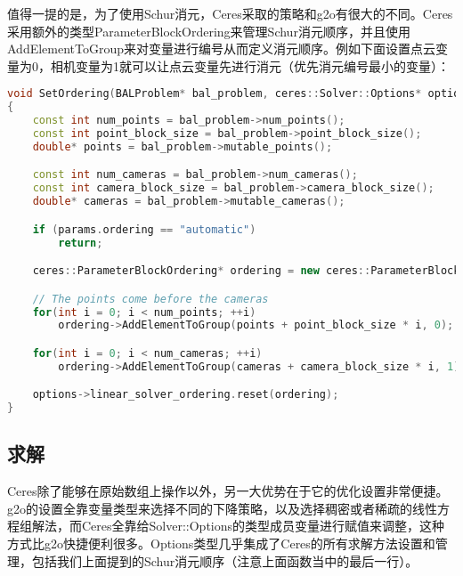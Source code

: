 值得一提的是，为了使用Schur消元，Ceres采取的策略和g2o有很大的不同。Ceres采用额外的类型ParameterBlockOrdering来管理Schur消元顺序，并且使用AddElementToGroup来对变量进行编号从而定义消元顺序。例如下面设置点云变量为0，相机变量为1就可以让点云变量先进行消元（优先消元编号最小的变量）：

\begin{lstlisting}[language=c++,caption=slambook/ch10/ceres_custombundle/ceresBundle.cpp]
void SetOrdering(BALProblem* bal_problem, ceres::Solver::Options* options, const BundleParams& params)
{
	const int num_points = bal_problem->num_points();
	const int point_block_size = bal_problem->point_block_size();
	double* points = bal_problem->mutable_points();

	const int num_cameras = bal_problem->num_cameras();
	const int camera_block_size = bal_problem->camera_block_size();
	double* cameras = bal_problem->mutable_cameras();

	if (params.ordering == "automatic")
		return;

	ceres::ParameterBlockOrdering* ordering = new ceres::ParameterBlockOrdering;

	// The points come before the cameras
	for(int i = 0; i < num_points; ++i)
		ordering->AddElementToGroup(points + point_block_size * i, 0);

	for(int i = 0; i < num_cameras; ++i)
		ordering->AddElementToGroup(cameras + camera_block_size * i, 1);

	options->linear_solver_ordering.reset(ordering);
}
\end{lstlisting}

\subsection{求解}

Ceres除了能够在原始数组上操作以外，另一大优势在于它的优化设置非常便捷。g2o的设置全靠变量类型来选择不同的下降策略，以及选择稠密或者稀疏的线性方程组解法，而Ceres全靠给Solver::Options的类型成员变量进行赋值来调整，这种方式比g2o快捷便利很多。Options类型几乎集成了Ceres的所有求解方法设置和管理，包括我们上面提到的Schur消元顺序（注意上面函数当中的最后一行）。

